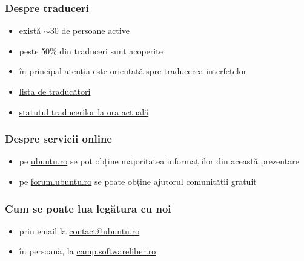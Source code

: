 \documentclass[compress]{beamer}
\begin{document}
\begin{frame}
\frametitle{Despre traduceri}

\begin{itemize}[<+->]
  \item există $\sim$30 de persoane active
  \item peste 50\% din traduceri sunt acoperite
  \item în principal atenția este orientată spre traducerea interfețelor
  \item \href{https://launchpad.net/~ubuntu-ro/+members}{lista de traducători}
  \item \href{https://translations.launchpad.net/ubuntu/quantal/+lang/ro}{statutul traducerilor la ora actuală}
\end{itemize}
\end{frame}

\begin{frame}
\frametitle{Despre servicii online}

\begin{itemize}[<+->]
  \item pe \href{http://ubuntu.ro}{ubuntu.ro} se pot obține majoritatea informațiilor din această prezentare
  \item pe \href{http://forum.ubuntu.ro}{forum.ubuntu.ro} se poate obține ajutorul comunității gratuit

\end{itemize}
\end{frame}

\begin{frame}
\frametitle{Cum se poate lua legătura cu noi}

\begin{itemize}[<+->]
  \item prin email la \href{mailto://contact@ubuntu.ro}{contact@ubuntu.ro}
  \item în persoană, la \href{http://camp.softwareliber.ro/}{camp.softwareliber.ro}
\end{itemize}
\end{frame}
\end{document}
